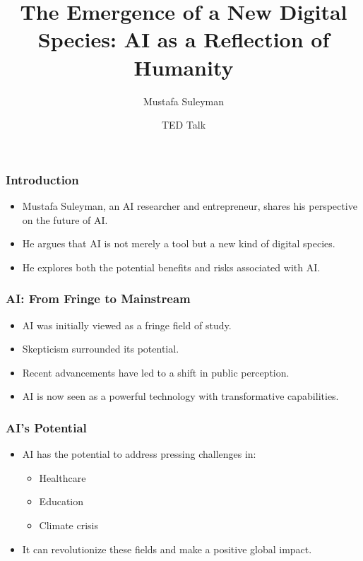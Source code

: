 \documentclass{beamer} \usepackage{graphicx}
\begin{document}
\begin{frame} \title{The Emergence of a New Digital Species: AI as a Reflection of Humanity} \author{Mustafa Suleyman} \date{TED Talk} \maketitle \end{frame}

\begin{frame} \frametitle{Introduction} \begin{itemize} \item Mustafa Suleyman, an AI researcher and entrepreneur, shares his perspective on the future of AI. \item He argues that AI is not merely a tool but a new kind of digital species. \item He explores both the potential benefits and risks associated with AI. \end{itemize} \end{frame}

\begin{frame} \frametitle{AI: From Fringe to Mainstream} \begin{itemize} \item AI was initially viewed as a fringe field of study. \item Skepticism surrounded its potential. \item Recent advancements have led to a shift in public perception. \item AI is now seen as a powerful technology with transformative capabilities. \end{itemize} \end{frame}

\begin{frame} \frametitle{AI's Potential} \begin{itemize} \item AI has the potential to address pressing challenges in: \begin{itemize} \item Healthcare \item Education \item Climate crisis \end{itemize} \item It can revolutionize these fields and make a positive global impact. \end{itemize} \end{frame}
\end{document}
